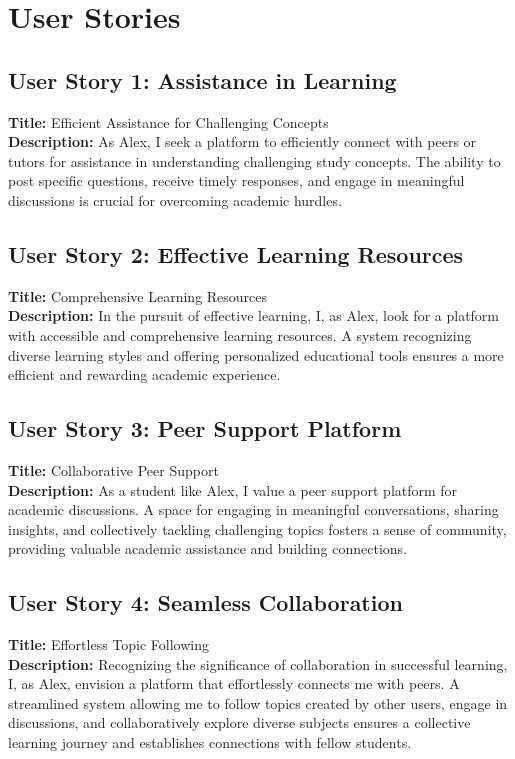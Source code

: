 \chapter{User Stories}\label{User Story}

\section{User Story 1: Assistance in Learning}
\textbf{Title:} Efficient Assistance for Challenging Concepts \\
\textbf{Description:} As Alex, I seek a platform to efficiently connect with peers or tutors for assistance in understanding challenging study concepts. The ability to post specific questions, receive timely responses, and engage in meaningful discussions is crucial for overcoming academic hurdles.

\section{User Story 2: Effective Learning Resources}
\textbf{Title:} Comprehensive Learning Resources \\
\textbf{Description:} In the pursuit of effective learning, I, as Alex, look for a platform with accessible and comprehensive learning resources. A system recognizing diverse learning styles and offering personalized educational tools ensures a more efficient and rewarding academic experience.

\section{User Story 3: Peer Support Platform}
\textbf{Title:} Collaborative Peer Support \\
\textbf{Description:} As a student like Alex, I value a peer support platform for academic discussions. A space for engaging in meaningful conversations, sharing insights, and collectively tackling challenging topics fosters a sense of community, providing valuable academic assistance and building connections.

\section{User Story 4: Seamless Collaboration}
\textbf{Title:} Effortless Topic Following \\
\textbf{Description:} Recognizing the significance of collaboration in successful learning, I, as Alex, envision a platform that effortlessly connects me with peers. A streamlined system allowing me to follow topics created by other users, engage in discussions, and collaboratively explore diverse subjects ensures a collective learning journey and establishes connections with fellow students.

